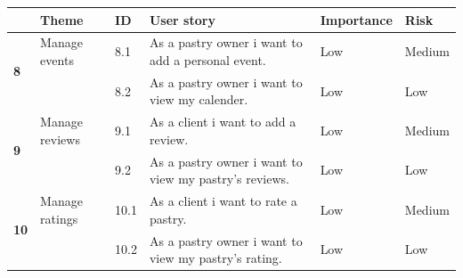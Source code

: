 \documentclass[12pt,a4paper]{report}
\begin{document}
\begin{table}[H]
\begin{center}
\begin{tabular}{|  p{1cm}|  p{4cm}|  p{1cm}| p{5cm}|  p{2cm}| p{2cm}|}
				\\
				\hline
			\end{tabular}
			
		\end{center}
		
	\end{table}
	\begin{table}[H]
		\begin{center}
			\captionsetup[table]{skip=10pt}
			\setlength\doublerulesep{0.5pt}
			\begin{tabular}{|  p{1cm}|  p{4cm}|  p{1cm}| p{5cm}|  p{2cm}| p{2cm}|}
				\hline 
				\rowcolor{LightCyan}
				\textbf{ } & \textbf{Theme} & \textbf{ID} & \textbf{User story} & \textbf{Importance} & \textbf{Risk} 
				\\
				\hline
				\multirow{2}{*}{\textbf{8} }
				&                        
				Manage events &                        
				8.1 &                        
				As a pastry owner i want to add a personal event.&                        
				Low &                        
				Medium
				\\
				\cline{3-6}
				&                        
				&                        
				8.2 &                        
				As a pastry owner i want to view my calender.&                        
				Low &                        
				Low
					
				\\
				\hline
				\multirow{2}{*}{\textbf{9} }
				&                        
				Manage reviews &                        
				9.1 &                        
				As a client i want to add a review.&                        
				Low &                        
				Medium
				\\
				\cline{3-6}
				&                        
				&                        
				9.2 &                        
				As a pastry owner i want to view my pastry's reviews.&                        
				Low &                        
				Low
					
				\\
				\hline
				\multirow{2}{*}{\textbf{10} }
				&                        
				Manage ratings &                        
				10.1 &                        
				As a client i want to rate a pastry.&                        
				Low &                        
				Medium
				\\
				\cline{3-6}
				&                        
				&                        
				10.2 &                        
				As a pastry owner i want to view my pastry's rating.&                        
				Low &                        
				Low
			

\end{tabular}
\end{center}
\end{table}
\end{document}
